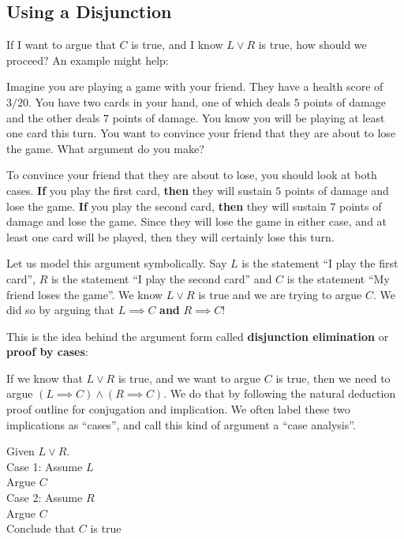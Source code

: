 \subsection{Using a Disjunction}

If I want to argue that $C$ is true, and I know $L \vee R$ is true, how should we proceed?  An example might help:

\begin{xca}
		Imagine you are playing a game with your friend.  They have a health score of $3/20$.  You have two cards in your hand, one of which deals $5$ points of damage and the other deals $7$ points of damage.  You know you will be playing at least one card this turn.  You want to convince your friend that they are about to lose the game.  What argument do you make?
\end{xca}

\begin{solutions}
		To convince your friend that they are about to lose, you should look at both cases.  \textbf{If} you play the first card, \textbf{then} they will sustain $5$ points of damage and lose the game.  \textbf{If} you play the second card, \textbf{then} they will sustain $7$ points of damage and lose the game.  Since they will lose the game in either case, and at least one card will be played, then they will certainly lose this turn.
	\end{solutions}

Let us model this argument symbolically.  Say $L$ is the statement ``I play the first card'', $R$ is the statement ``I play the second card'' and $C$ is the statement ``My friend loses the game''.  We know $L \vee R$ is true and we are trying to argue $C$.  We did so by arguing that $L \implies C$ \textbf{and} $R \implies C$!

This is the idea behind the argument form called \textbf{disjunction elimination} or \textbf{proof by cases}:

If we know that $L \vee R$ is true, and we want to argue $C$ is true, then we need to argue $(L \implies C) \wedge (R \implies C)$.   We do that by following the natural deduction proof outline for conjugation and implication.  We often label these two implications as ``cases'', and call this kind of argument a ``case analysis''.

\begin{fitch*}
		\textrm{Given $L \vee R$.}\\
		\textrm{Case 1:  Assume $L$}\\
		\fa \textrm{Argue $C$}\\
		\textrm{Case 2:  Assume $R$}\\
		\fa \textrm{Argue $C$}\\
		\textrm{Conclude that $C$ is true}
	\end{fitch*}



